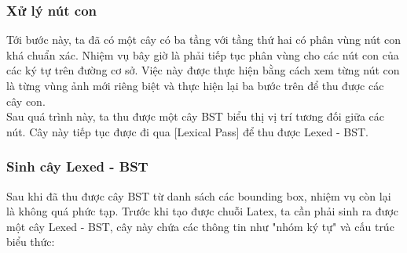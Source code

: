 \documentclass[a4paper]{article}
\theoremstyle{definition}
\begin{document}

	
	\subsubsection*{Xử lý nút con}
	
	Tới bước này, ta đã có một cây có ba tầng với tầng thứ hai có phân vùng nút con khá chuẩn xác. Nhiệm vụ bây giờ là phải tiếp tục phân vùng cho các nút con của các ký tự trên đường cơ sở. Việc này được thực hiện bằng cách xem từng nút con là từng vùng ảnh mới riêng biệt và thực hiện lại ba bước trên để thu được các cây con. \\
	
	Sau quá trình này, ta thu được một cây BST biểu thị vị trí tương đối giữa các nút. Cây này tiếp tục được đi qua [Lexical Pass] để thu được Lexed - BST\cite{zanibbi}.
	
	\subsubsection{Sinh cây Lexed - BST\cite{zanibbi}}
	
	Sau khi đã thu được cây BST từ danh sách các bounding box, nhiệm vụ còn lại là không quá phức tạp. Trước khi tạo được chuỗi Latex, ta cần phải sinh ra được một cây Lexed - BST\cite{zanibbi}, cây này chứa các thông tin như "nhóm ký tự" và cấu trúc biểu thức:
	
\end{document}
